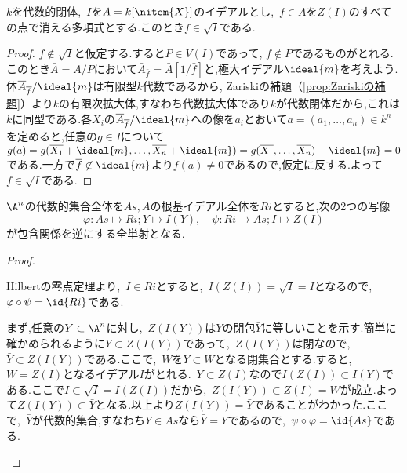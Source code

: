 \begin{thm}\label{thm:Nullstellensatz}
	$k$を代数的閉体,~$ I $を$A=k[\nitem{X}]$のイデアルとし,~$f\in A$を$Z( I )$のすべての点で消える多項式とする.このとき$f\in\sqrt{ I }$である.
\end{thm}
\begin{proof}
	$f\not\in\sqrt{I}$と仮定する.すると$P\in V(I)$であって, $f\not\in P$であるものがとれる. このとき$\bar{A}=A/P$において$\bar{A}_{\bar{f}}=\bar{A}[1/\bar{f}]$と,極大イデアル$\ideal{m}$を考えよう.体$\bar{A}_{\bar{f}}/\ideal{m}$は有限型$k$代数であるから, Zariskiの補題（\ref{prop:Zariskiの補題}）より$k$の有限次拡大体,すなわち代数拡大体であり$k$が代数閉体だから,これは$k$に同型である.各$X_i$の$\bar{A}_{\bar{f}}/\ideal{m}$への像を$a_i$とおいて$a=(a_1,\dots,a_n)\in k^n$を定めると,任意の$g\in I$について$g(a)=g(\bar{X_1}+\ideal{m},\dots,\bar{X_n}+\ideal{m})=g(\bar{X_1},\dots,\bar{X_n})+\ideal{m}=0$である.一方で$\bar{f}\not\in\ideal{m}$より$f(a)\neq0$であるので,仮定に反する.よって$f\in\sqrt{I}$である.
\end{proof}

\begin{prop}
	$\A^n$の代数的集合全体を$As,A$の根基イデアル全体を$Ri$とすると,次の2つの写像
	\[\varphi:As\longmapsto Ri;Y\longmapsto I(Y),\quad\psi:Ri\longrightarrow As; I \longmapsto Z( I )\]
	が包含関係を逆にする全単射となる.
\end{prop}
\begin{proof}
	\begin{step}
		\item Hilbertの零点定理より,~$ I \in Ri$とすると,~$I(Z( I ))=\sqrt{ I }= I $となるので,~$\varphi\circ\psi=\id{Ri}$である.
		\item まず,任意の$Y\subset \A^n$に対し,~$Z(I(Y))$は$Y$の閉包$\bar{Y}$に等しいことを示す.簡単に確かめられるように$Y\subset Z(I(Y))$であって,~$Z(I(Y))$は閉なので,~$\bar{Y}\subset Z(I(Y))$である.ここで,~$W$を$Y\subset W$となる閉集合とする.すると,~$W=Z( I )$となるイデアル$ I $がとれる.~$Y\subset Z( I )$なので$I(Z( I ))\subset I(Y)$である.ここで$ I \subset \sqrt{ I }=I(Z( I ))$だから,~$Z(I(Y))\subset Z( I )=W$が成立.よって$Z(I(Y))\subset \bar{Y}$となる.以上より$Z(I(Y))=\bar{Y}$であることがわかった.ここで,~$\bar{Y}$が代数的集合,すなわち$Y\in As$なら$\bar{Y}=Y$であるので,~$\psi\circ\varphi=\id{As}$である.
	\end{step}
\end{proof}
